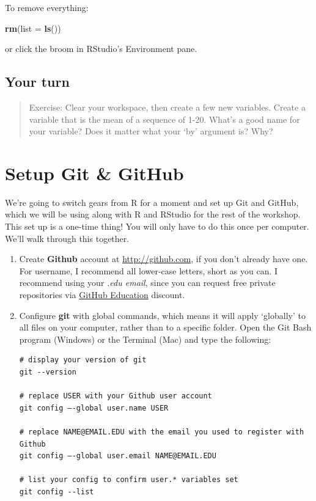 \documentclass[]{book}
\newenvironment{Shaded}{\begin{snugshade}}{\end{snugshade}}
\newcommand{\KeywordTok}[1]{\textcolor[rgb]{0.13,0.29,0.53}{\textbf{{#1}}}}
\newcommand{\DataTypeTok}[1]{\textcolor[rgb]{0.13,0.29,0.53}{{#1}}}
\newcommand{\NormalTok}[1]{{#1}}
\theoremstyle{definition}
\theoremstyle{definition}
\theoremstyle{definition}
\theoremstyle{remark}
\begin{document}
To remove everything:

\begin{Shaded}
\begin{Highlighting}[]
\KeywordTok{rm}\NormalTok{(}\DataTypeTok{list =} \KeywordTok{ls}\NormalTok{())}
\end{Highlighting}
\end{Shaded}

or click the broom in RStudio's Environment pane.

\subsection{Your turn}\label{your-turn-1}

\begin{quote}
Exercise: Clear your workspace, then create a few new variables. Create
a variable that is the mean of a sequence of 1-20. What's a good name
for your variable? Does it matter what your `by' argument is? Why?
\end{quote}

\section{Setup Git \& GitHub}\label{setup-git-github}

We're going to switch gears from R for a moment and set up Git and
GitHub, which we will be using along with R and RStudio for the rest of
the workshop. This set up is a one-time thing! You will only have to do
this once per computer. We'll walk through this together.

\begin{enumerate}
\def\labelenumi{\arabic{enumi}.}
\item
  Create \textbf{Github} account at \url{http://github.com}, if you
  don't already have one. For username, I recommend all lower-case
  letters, short as you can. I recommend using your \emph{.edu email},
  since you can request free private repositories via
  \href{https://education.github.com/}{GitHub Education} discount.
\item
  Configure \textbf{git} with global commands, which means it will apply
  `globally' to all files on your computer, rather than to a specific
  folder. Open the Git Bash program (Windows) or the Terminal (Mac) and
  type the following:

\begin{verbatim}
# display your version of git
git --version

# replace USER with your Github user account
git config –-global user.name USER

# replace NAME@EMAIL.EDU with the email you used to register with Github
git config –-global user.email NAME@EMAIL.EDU

# list your config to confirm user.* variables set
git config --list
\end{verbatim}
\end{enumerate}
\end{document}
